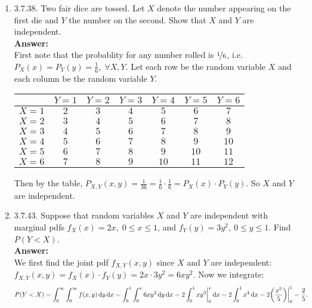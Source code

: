 \documentclass{article}
\begin{document}
\begin{enumerate}
        \item 3.7.38. Two fair dice are tossed. Let $X$ denote the number appearing on the first die and $Y$ the number on the second. Show that $X$ and $Y$ are independent.\\
        \textbf{Answer: }\\
        First note that the probablity for any number rolled is $\nicefrac{1}{6}$, i.e. $P_X(x) = P_Y(y) = \frac{1}{6},\; \forall X,Y$. Let each row be the random variable $X$ and each column be the random variable $Y$.
        \begin{center}
            \begin{tabular}{|c|| c| c| c| c| c| c|}
                \hline
                & $Y=1$ & $Y=2$ & $Y=3$ & $Y=4$ & $Y=5$ & $Y=6$\\
                \hline \hline
                $X=1$ & $2$ & $3$ & $4$ & $5$ & $6$ & $7$\\
                \hline
                $X=2$ & $3$ & $4$ & $5$ & $6$ & $7$ & $8$\\
                \hline
                $X=3$ & $4$ & $5$ & $6$ & $7$ & $8$ & $9$\\
                \hline
                $X=4$ & $5$ & $6$ & $7$ & $8$ & $9$ & $10$\\
                \hline
                $X=5$ & $6$ & $7$ & $8$ & $9$ & $10$ & $11$\\
                \hline
                $X=6$ & $7$ & $8$ & $9$ & $10$ & $11$ & $12$\\
                \hline
            \end{tabular}
        \end{center}
        Then by the table, $P_{X,Y}(x,y) = \frac{1}{36} = \frac{1}{6} \cdot \frac{1}{6} = P_X(x) \cdot P_Y(y)$. So $X$ and $Y$ are independent.\\
        
        \item 3.7.43. Suppose that random variables $X$ and $Y$ are independent with marginal pdfs $f_X(x) = 2x, \; 0 \leq x \leq 1$, and $f_Y(y) = 3y^2, \: 0 \leq y \leq 1$. Find $P(Y < X)$.\\
        \textbf{Answer: }\\
        We first find the joint pdf $f_{X,Y}(x,y)$ since $X$ and $Y$ are independent: $f_{X,Y}(x,y) = f_X(x) \cdot f_Y(y) = 2x \cdot 3y^2 = 6xy^2$. Now we integrate:
            \begin{align*}
                P(Y < X) &= \int_0^\infty\int_0^\infty f(x,y) \dif y \dif x = \int_0^1\int_0^x 6xy^2 \dif y \dif x = 2\int_0^1 xy^3\bigg|_0^x \dif x = 2\int_0^1 x^4 \dif x = 2\bigg(\frac{x^5}{5}\bigg)\bigg|_0^1 = \frac{2}{5}.
            \end{align*}
        

\end{enumerate}
\end{document}
